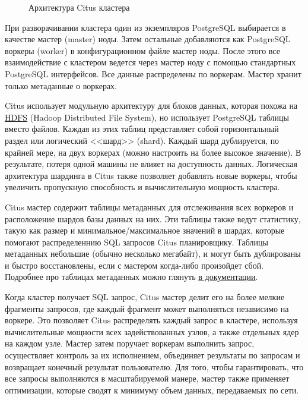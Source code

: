 \begin{figure}[ht!]
  \caption{Архитектура Citus кластера}
  \label{fig:citus_basic_arch}
\end{figure}

При разворачивании кластера один из экземпляров PostgreSQL выбирается в качестве мастер (master) ноды. Затем остальные добавляются как PostgreSQL воркеры (worker) в конфигурационном файле мастер ноды. После этого все взаимодействие с кластером ведется через мастер ноду с помощью стандартных PostgreSQL интерфейсов. Все данные распределены по воркерам. Мастер хранит только метаданные о воркерах.

Citus использует модульную архитектуру для блоков данных, которая похожа на \href{https://ru.wikipedia.org/wiki/Hadoop#HDFS}{HDFS} (Hadoop Distributed File System), но использует PostgreSQL таблицы вместо файлов. Каждая из этих таблиц представляет собой горизонтальный раздел или логический <<шард>> (shard). Каждый шард дублируется, по крайней мере, на двух воркерах (можно настроить на более высокое значение). В результате, потеря одной машины не влияет на доступность данных. Логическая архитектура шардинга в Citus также позволяет добавлять новые воркеры, чтобы увеличить пропускную способность и вычислительную мощность кластера.

Citus мастер содержит таблицы метаданных для отслеживания всех воркеров и расположение шардов базы данных на них. Эти таблицы также ведут статистику, такую как размер и минимальное/максимальное значений в шардах, которые помогают распределеннию SQL запросов Citus планировщику. Таблицы метаданных небольшие (обычно несколько мегабайт), и могут быть дублированы и быстро восстановлены, если с мастером когда-либо произойдет сбой. Подробнее про таблицах метаданных можно глянуть \href{https://docs.citusdata.com/en/latest/reference/metadata_tables.html}{в документации}.

Когда кластер получает SQL запрос, Citus мастер делит его на более мелкие фрагменты запросов, где каждый фрагмент может выполняться независимо на воркере. Это позволяет Citus распределять каждый запрос в кластере, используя вычислительные мощности всех задействованных узлов, а также отдельных ядер на каждом узле. Мастер затем поручает воркерам выполнить запрос, осуществляет контроль за их исполнением, объединяет результаты по запросам и возвращает конечный результат пользователю. Для того, чтобы гарантировать, что все запросы выполняются в масштабируемой манере, мастер также применяет оптимизации, которые сводят к минимуму объем данных, передаваемых по сети.

